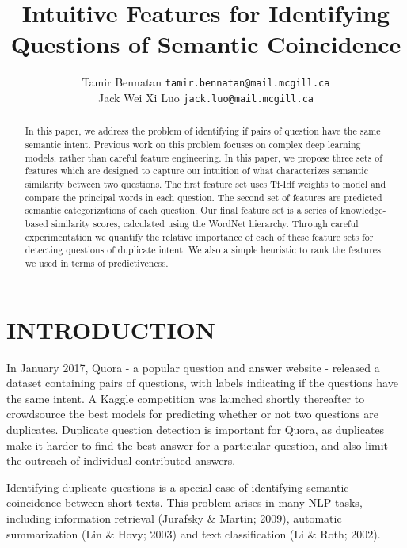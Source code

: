 \documentclass[letterpaper, 10 pt, conference]{ieeeconf}  %
\title{\LARGE \bf
Intuitive Features for Identifying Questions of Semantic Coincidence
}
\author{ \parbox{3 in}{\centering Tamir Bennatan
         {\tt\small tamir.bennatan@mail.mcgill.ca}}
         \hspace*{ 0.5 in}
         \parbox{3 in}{ \centering Jack Wei Xi Luo
         \break
         {\tt\small jack.luo@mail.mcgill.ca}}
}
\begin{document}
\maketitle
\thispagestyle{empty}
\pagestyle{empty}


\begin{abstract}

In this paper, we address the problem of identifying if pairs of question have the same semantic intent. Previous work on this problem focuses on complex deep learning models, rather than careful feature engineering. In this paper, we propose three sets of features which are designed to capture our intuition of what characterizes semantic similarity between two questions. The first feature set uses Tf-Idf weights to model and compare the principal words in each question. The second set of features are predicted semantic categorizations of each question. Our final feature set is a series of  knowledge-based similarity scores, calculated using the WordNet hierarchy. Through careful experimentation we quantify the relative importance of each of these feature sets for detecting questions of duplicate intent. We also a simple heuristic to rank the features we used in terms of predictiveness. 

\end{abstract}


\section{INTRODUCTION}

In January 2017, Quora - a popular question and answer website - released a dataset containing pairs of questions, with labels indicating if the questions have the same intent. A Kaggle competition was launched shortly thereafter to crowdsource the best models for predicting whether or not two questions are duplicates. Duplicate question detection is important for Quora, as duplicates make it harder to find the best answer for a particular question, and also limit the outreach of individual contributed answers.

Identifying duplicate questions is a special case of identifying semantic coincidence between short texts. This problem arises in many NLP tasks, including information retrieval (Jurafsky \& Martin; 2009), automatic summarization (Lin \& Hovy; 2003) and text classification (Li \& Roth; 2002). 
\end{document}
